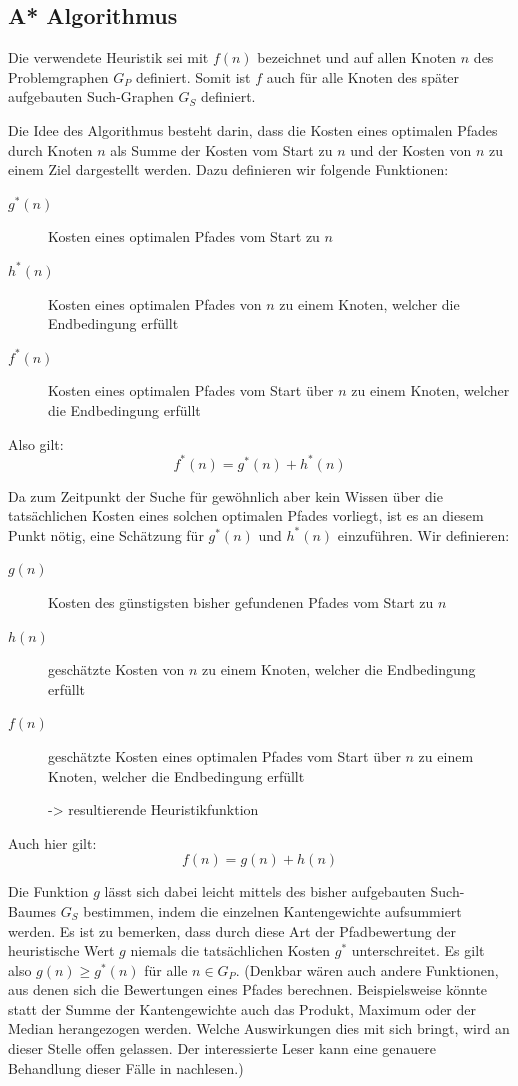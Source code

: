 \subsection{A* Algorithmus}

Die verwendete Heuristik sei mit $f(n)$ bezeichnet und auf allen Knoten $n$ des Problemgraphen $G_{P}$ definiert. Somit ist $f$ auch für alle Knoten des später aufgebauten Such-Graphen $G_{S}$ definiert.

Die Idee des Algorithmus besteht darin, dass die Kosten eines optimalen Pfades durch Knoten $n$ als Summe der Kosten vom Start zu $n$ und der Kosten von $n$ zu einem Ziel dargestellt werden.
Dazu definieren wir folgende Funktionen:

\begin{description}
	\item[$g^{*}(n)$]{Kosten eines optimalen Pfades vom Start zu $n$}
	\item[$h^{*}(n)$]{Kosten eines optimalen Pfades von $n$ zu einem Knoten, welcher die Endbedingung erfüllt}
	\item[$f^{*}(n)$]{Kosten eines optimalen Pfades vom Start über $n$ zu einem Knoten, welcher die Endbedingung erfüllt}
\end{description}
Also gilt: \[f^{*}(n)=g^{*}(n)+h^{*}(n)\]


Da zum Zeitpunkt der Suche für gewöhnlich aber kein Wissen über die tatsächlichen Kosten eines solchen optimalen Pfades vorliegt, ist es an diesem Punkt nötig, eine Schätzung für $g^{*}(n)$ und $h^{*}(n)$ einzuführen.
Wir definieren:

\begin{description}
	\item[$g(n)$]{Kosten des günstigsten bisher gefundenen Pfades vom Start zu $n$}
	\item[$ h(n)$]{geschätzte Kosten von $n$ zu einem Knoten, welcher die Endbedingung erfüllt}
	\item[$ f(n)$]{geschätzte Kosten eines optimalen Pfades vom Start über $n$ zu einem Knoten, welcher die Endbedingung erfüllt

		-> resultierende Heuristikfunktion}
\end{description}
Auch hier gilt: \[f(n)=g(n)+h(n)\]

Die Funktion $g$ lässt sich dabei leicht mittels des bisher aufgebauten Such-Baumes $G_{S}$ bestimmen, indem die einzelnen Kantengewichte aufsummiert werden.
Es ist zu bemerken, dass durch diese Art der Pfadbewertung der heuristische Wert $g$ niemals die tatsächlichen Kosten $g^{*}$ unterschreitet.
Es gilt also $g(n) \geq g^{*}(n)$ für alle $n \in G_{P}$.
(Denkbar wären auch andere Funktionen, aus denen sich die Bewertungen eines Pfades berechnen. Beispielsweise könnte statt der Summe der Kantengewichte auch das Produkt, Maximum oder der Median herangezogen werden. Welche Auswirkungen dies mit sich bringt, wird an dieser Stelle offen gelassen. Der interessierte Leser kann eine genauere Behandlung dieser Fälle in \cite{Dechter:1985:GBS:3828.3830} nachlesen.)

